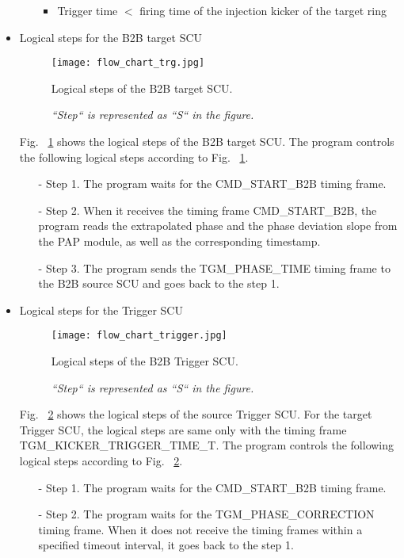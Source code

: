 \begin{itemize}
\begin{itemize}
\begin{itemize}
	\item Trigger time $<$ firing time of the injection kicker of the target ring

\end{itemize}
 

	\end{itemize}
\item Logical steps for the B2B target SCU
\begin{figure}[H]
   \centering   
   \texttt{[image: flow\_chart\_trg.jpg]}
   \caption{Logical steps of the B2B target SCU.}
	\caption*{\textsl{\small{``Step`` is represented as ``S`` in the figure. }}}
   \label{flow_chart_trg}
\end{figure}
Fig. ~\ref{flow_chart_trg} shows the logical steps of the B2B target SCU. The program controls the following logical steps according to Fig. ~\ref{flow_chart_trg}.
 	\begin{itemize}
		\item[-]Step 1. The program waits for the CMD\_START\_B2B timing frame.
 		\item[-]Step 2. When it receives the timing frame CMD\_START\_B2B, the program reads the extrapolated phase and the phase deviation slope from the PAP module, as well as the corresponding timestamp.
		\item[-]Step 3. The program sends the TGM\_PHASE\_TIME timing frame to the B2B source SCU and goes back to the step 1.
	\end{itemize}
\item Logical steps for the Trigger SCU
\begin{figure}[H]
   \centering   
   \texttt{[image: flow\_chart\_trigger.jpg]}
   \caption{Logical steps of the B2B Trigger SCU.}
	\caption*{\textsl{\small{``Step`` is represented as ``S`` in the figure.}}}
   \label{flow_chart_trigger}
\end{figure}
Fig. ~\ref{flow_chart_trigger} shows the logical steps of the source Trigger SCU. For the target Trigger SCU, the logical steps are same only with the timing frame TGM\_KICKER\_TRIGGER\_TIME\_T. The program controls the following logical steps according to Fig. ~\ref{flow_chart_trigger}.
 	\begin{itemize}
		\item[-]Step 1. The program waits for the CMD\_START\_B2B timing frame. 
		\item[-]Step 2. The program waits for the TGM\_PHASE\_CORRECTION timing frame. When it does not receive the timing frames within a specified timeout interval, it goes back to the step 1.

\end{itemize}
\end{itemize}
